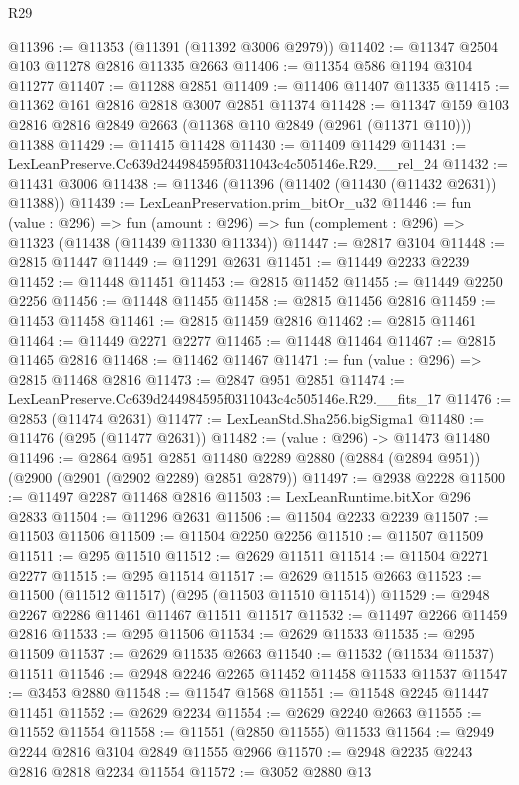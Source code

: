 \begin{lexlean}{R29}
\begin{coremodule}
@11396 := @11353 (@11391 (@11392 @3006 @2979))
@11402 := @11347 @2504 @103 @11278 @2816 @11335 @2663
@11406 := @11354 @586 @1194 @3104 @11277
@11407 := @11288 @2851
@11409 := @11406 @11407 @11335
@11415 := @11362 @161 @2816 @2818 @3007 @2851 @11374
@11428 := @11347 @159 @103 @2816 @2816 @2849 @2663 (@11368 @110 @2849 (@2961 (@11371 @110))) @11388
@11429 := @11415 @11428
@11430 := @11409 @11429
@11431 := LexLeanPreserve.Cc639d244984595f0311043c4c505146e.R29.__rel_24
@11432 := @11431 @3006
@11438 := @11346 (@11396 (@11402 (@11430 (@11432 @2631)) @11388))
@11439 := LexLeanPreservation.prim_bitOr_u32
@11446 := fun (value : @296) =>
  fun (amount : @296) => fun (complement : @296) => @11323 (@11438 (@11439 @11330 @11334))
@11447 := @2817 @3104
@11448 := @2815 @11447
@11449 := @11291 @2631
@11451 := @11449 @2233 @2239
@11452 := @11448 @11451
@11453 := @2815 @11452
@11455 := @11449 @2250 @2256
@11456 := @11448 @11455
@11458 := @2815 @11456 @2816
@11459 := @11453 @11458
@11461 := @2815 @11459 @2816
@11462 := @2815 @11461
@11464 := @11449 @2271 @2277
@11465 := @11448 @11464
@11467 := @2815 @11465 @2816
@11468 := @11462 @11467
@11471 := fun (value : @296) => @2815 @11468 @2816
@11473 := @2847 @951 @2851
@11474 := LexLeanPreserve.Cc639d244984595f0311043c4c505146e.R29.__fits_17
@11476 := @2853 (@11474 @2631)
@11477 := LexLeanStd.Sha256.bigSigma1
@11480 := @11476 (@295 (@11477 @2631))
@11482 := (value : @296) -> @11473 @11480
@11496 := @2864
    @951
    @2851
    @11480
    @2289
    @2880
    (@2884 (@2894 @951))
    (@2900 (@2901 (@2902 @2289) @2851 @2879))
@11497 := @2938 @2228
@11500 := @11497 @2287 @11468 @2816
@11503 := LexLeanRuntime.bitXor @296 @2833
@11504 := @11296 @2631
@11506 := @11504 @2233 @2239
@11507 := @11503 @11506
@11509 := @11504 @2250 @2256
@11510 := @11507 @11509
@11511 := @295 @11510
@11512 := @2629 @11511
@11514 := @11504 @2271 @2277
@11515 := @295 @11514
@11517 := @2629 @11515 @2663
@11523 := @11500 (@11512 @11517) (@295 (@11503 @11510 @11514))
@11529 := @2948 @2267 @2286 @11461 @11467 @11511 @11517
@11532 := @11497 @2266 @11459 @2816
@11533 := @295 @11506
@11534 := @2629 @11533
@11535 := @295 @11509
@11537 := @2629 @11535 @2663
@11540 := @11532 (@11534 @11537) @11511
@11546 := @2948 @2246 @2265 @11452 @11458 @11533 @11537
@11547 := @3453 @2880
@11548 := @11547 @1568
@11551 := @11548 @2245 @11447 @11451
@11552 := @2629 @2234
@11554 := @2629 @2240 @2663
@11555 := @11552 @11554
@11558 := @11551 (@2850 @11555) @11533
@11564 := @2949 @2244 @2816 @3104 @2849 @11555 @2966
@11570 := @2948 @2235 @2243 @2816 @2818 @2234 @11554
@11572 := @3052 @2880 @13

\end{coremodule}
\end{lexlean}
